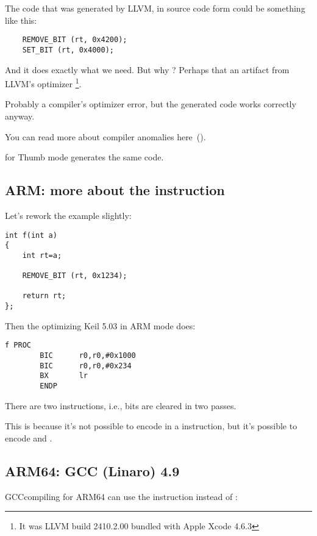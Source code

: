The code that was generated by LLVM, in source code form could be something like this:

\begin{lstlisting}
    REMOVE_BIT (rt, 0x4200);
    SET_BIT (rt, 0x4000);
\end{lstlisting}

And it does exactly what we need. 
But why ? 
Perhaps that an artifact from LLVM's optimizer
\footnote{It was LLVM build 2410.2.00 bundled with Apple Xcode 4.6.3}.

Probably a compiler's optimizer error, but the generated code works correctly anyway.

You can read more about compiler anomalies here~().

\OptimizingXcodeIV for Thumb mode generates the same code.

\subsection{ARM: more about the  instruction}

Let's rework the example slightly:

\begin{lstlisting}
int f(int a)
{
    int rt=a;

    REMOVE_BIT (rt, 0x1234);

    return rt;
};
\end{lstlisting}

Then the optimizing Keil 5.03 
in ARM mode does:

\begin{lstlisting}
f PROC
        BIC      r0,r0,#0x1000
        BIC      r0,r0,#0x234
        BX       lr
        ENDP
\end{lstlisting}

There are two  instructions, i.e., bits  are cleared in two passes.

This is because it's not possible to encode  in a  instruction, 
but it's possible to encode  and .

\subsection{ARM64: \Optimizing GCC (Linaro) 4.9}

\Optimizing GCCcompiling for ARM64 can use the \AND instruction instead of :

